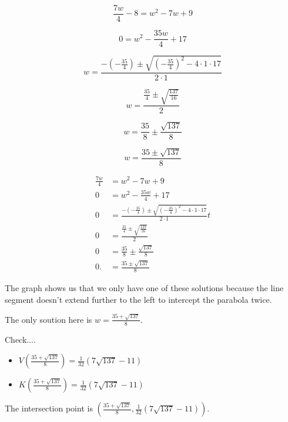 \documentclass{ximera}
\begin{document}
\[    \frac{7w}{4} - 8 = w^2 - 7 w + 9             \]


\[  0 = w^2 - \frac{35w}{4} + 17             \]


\[   w = \frac{-(- \tfrac{35}{4}) \pm  \sqrt{(- \tfrac{35}{4})^2 - 4 \cdot 1 \cdot 17}}{2 \cdot 1}     \]



\[   w = \frac{\tfrac{35}{4} \pm  \sqrt{\tfrac{137}{16}}}{2}     \]


\[   w = \frac{35}{8} \pm  \frac{\sqrt{137}}{8}   \]


\[   w = \frac{35 \pm \sqrt{137}}{8}    \]








\begin{align*}
\frac{7w}{4}    &= w^2 - 7 w + 9     \\
0               &= w^2 - \frac{35w}{4} + 17  \\
0           &= \frac{-(- \tfrac{35}{4}) \pm  \sqrt{(- \tfrac{35}{4})^2 - 4 \cdot 1 \cdot 17}}{2 \cdot 1} t \\
0           &= \frac{\tfrac{35}{4} \pm  \sqrt{\tfrac{137}{16}}}{2}  \\
0           &=   \frac{35}{8} \pm  \frac{\sqrt{137}}{8} \\
0.          &= \frac{35 \pm \sqrt{137}}{8} 
\end{align*}







The graph shows us that we only have one of these solutions because the line segment doesn't extend further to the left to intercept the parabola twice.


The only soution here is $w = \frac{35 + \sqrt{137}}{8} $.








Check....
\begin{itemize}
\item $V\left(\frac{35 + \sqrt{137}}{8}\right) =  \frac{1}{32}(7 \sqrt{137} - 11)  $




\item $K\left(\frac{35 + \sqrt{137}}{8}\right) =  \frac{1}{32}(7 \sqrt{137} - 11)  $
\end{itemize}


The intersection point is $\left(\frac{35 + \sqrt{137}}{8}, \frac{1}{32}(7 \sqrt{137} - 11) \right)$.
\end{document}
